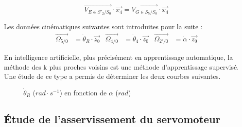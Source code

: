 $$\overrightarrow{V_{E\in S'_2/S_0}}\cdot\overrightarrow{x_4}=\overrightarrow{V_{G\in S_5/S_0}}\cdot\overrightarrow{x_4}$$


Les données cinématiques suivantes sont introduites pour la suite :
\begin{align*}
\overrightarrow{\Omega_{5/0}} &= \dot{\theta}_R\cdot \overrightarrow{z_0} & \overrightarrow{\Omega_{4/0}} &= \dot{\theta}_4\cdot \overrightarrow{z_0} & \overrightarrow{\Omega_{2'/0}} &= \dot{\alpha}\cdot \overrightarrow{z_0}
\end{align*}



En intelligence artificielle, plus précisément en apprentissage automatique, la méthode des k plus proches voisins est une méthode d’apprentissage supervisé. Une étude de ce type a permis de déterminer les deux courbes suivantes.

\begin{figure}[!ht]
 \begin{minipage}{0.48\textwidth}
   \def\svgwidth{1.1\linewidth}
   \centering
   \caption{\label{fig07c}$\theta_R$ ($rad$) et $\theta_4$ (rad) en fonction de $\alpha$ ($rad$)}
 \end{minipage}\hfill
 \begin{minipage}{0.48\textwidth}
   \def\svgwidth{1.1\linewidth}
   \centering
   \caption{\label{fig07d}$\dot{\theta}_R$ ($rad\cdot s^{-1}$) en fonction de $\alpha$ ($rad$)}
 \end{minipage}
\end{figure}


\subsection{Étude de l'asservissement du servomoteur}

